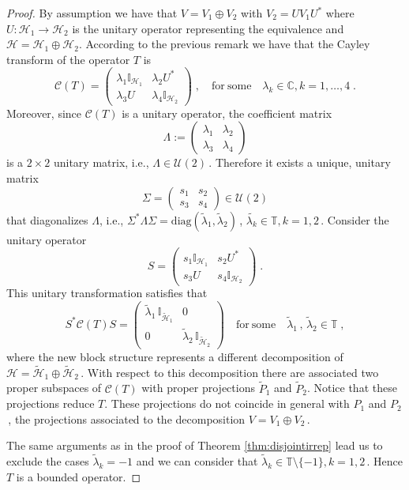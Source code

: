 \documentclass[a4paper,12pt]{amsart}
\renewcommand{\H}{\mathcal{H}}
\newcommand{\C}{\mathcal{C}}
\newcommand{\1}{\mathbb{I}}
\numberwithin{equation}{section}
\numberwithin{theorem}{section}
\begin{document}
\begin{proof}
By assumption we have that $V=V_1\oplus V_2$ with $V_2= UV_1U^*$ where $U:\H_1\to\H_2$ is the unitary operator 
representing the equivalence and $\H=\H_1\oplus \H_2$. According to the previous remark we have that the Cayley transform of the operator $T$ is 
$$\mathcal{C}(T)=\begin{pmatrix}
                  \lambda_1 \1_{\H_1} &  \lambda_2 U^* \\
                  \lambda_3 U  & \lambda_4 \1_{\H_2} 
                \end{pmatrix}\;,\quad\mathrm{for~some}\quad\lambda_k\in\mathbb{C}, k=1,\dots, 4\;.$$
Moreover, since $\C(T)$ is a unitary operator, the coefficient matrix 
$$\Lambda:=	\begin{pmatrix}
\lambda_1 & \lambda_2 \\ \lambda_ 3 & \lambda_4
\end{pmatrix}$$
is a $2\times 2$ unitary matrix, i.e., $\Lambda\in\mathcal{U}(2)$\,. Therefore it exists a unique, unitary matrix 
$$\Sigma=	\begin{pmatrix}
s_1 & s_2 \\ s_ 3 & s_4
\end{pmatrix}\in \mathcal{U}(2)$$
that diagonalizes $\Lambda$, i.e., $\Sigma^*\Lambda \Sigma=\mathrm{diag}(\tilde{\lambda}_1,\tilde{\lambda}_2)$\,, 
$\tilde{\lambda_k}\in\mathbb{T},k=1,2$\,. Consider the unitary operator 
$$S=	\begin{pmatrix}
s_1\1_{\H_1} & s_2U^* \\ s_3U & s_4\1_{\H_2}
\end{pmatrix}\;.$$
This unitary transformation satisfies that 
\begin{equation}
S^*\C(T)S=\begin{pmatrix} \tilde{\lambda}_1 \,\1_{\tilde{\H}_1}& 0 \\ 
                          0 & \tilde{\lambda}_ 2\, \1_{\tilde{\H}_2} \end{pmatrix}
                          \quad\mathrm{for~some}\quad\tilde{\lambda}_1\,,\,\tilde{\lambda}_2\in\mathbb{T} \;,
\end{equation}
where the new block structure represents a different decomposition of $\H=\tilde{\H}_1\oplus\tilde{\H}_2$\,. 
With respect to this decomposition there are associated two proper subspaces of $\C(T)$ with proper projections $\tilde{P}_1$ and $\tilde{P}_2$. 
Notice that these projections reduce $T$. These projections do not coincide in general with $P_1$ and $P_2$\,, 
the projections associated to the decomposition $V=V_1\oplus V_2$\,.

The same arguments as in the proof of Theorem \ref{thm:disjointirrep} lead us to exclude the cases $\tilde{\lambda}_k=-1$ 
and we can consider that $\tilde{\lambda}_k\in\mathbb{T}\setminus \{-1\}, k=1,2$\,. Hence $T$ is a bounded operator.
\end{proof}
\end{document}
